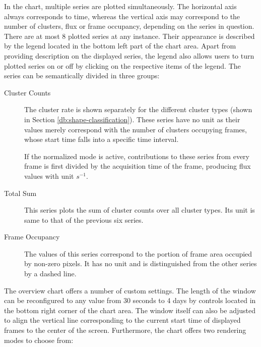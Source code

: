 In the chart, multiple series are plotted simultaneously. The horizontal axis always corresponds to time, whereas the vertical axis may correspond to the number of clusters, flux or frame occupancy, depending on the series in question. There are at most 8 plotted series at any instance. Their appearance is described by the legend located in the bottom left part of the chart area. Apart from providing description on the displayed series, the legend also allows users to turn plotted series on or off by clicking on the respective items of the legend. The series can be semantically divided in three groups:

\begin{description}
	\item[Cluster Counts]
	The cluster rate is shown separately for the different cluster types (shown in Section \ref{db:shape-classification}). These series have no unit as their values merely correspond with the number of clusters occupying frames, whose start time falls into a specific time interval.

	If the normalized mode is active, contributions to these series from every frame is first divided by the acquisition time of the frame, producing flux values with unit $s^{-1}$.

	\item[Total Sum]
	This series plots the sum of cluster counts over all cluster types. Its unit is same to that of the previous six series.

	\item[Frame Occupancy]
	The values of this series correspond to the portion of frame area occupied by non-zero pixels. It has no unit and is distinguished from the other series by a dashed line. 
\end{description}

The overview chart offers a number of custom settings. The length of the window can be reconfigured to any value from 30 seconds to 4 days by controls located in the bottom right corner of the chart area. The window itself can also be adjusted to align the vertical line corresponding to the current start time of displayed frames to the center of the screen. Furthermore, the chart offers two rendering modes to choose from:

